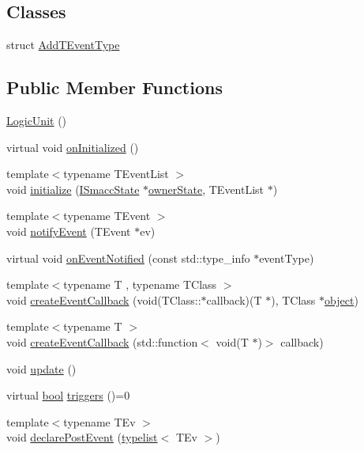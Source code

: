 \subsection*{Classes}
\begin{DoxyCompactItemize}
\item 
struct \hyperlink{structsmacc_1_1LogicUnit_1_1AddTEventType}{Add\+T\+Event\+Type}
\end{DoxyCompactItemize}
\subsection*{Public Member Functions}
\begin{DoxyCompactItemize}
\item 
\hyperlink{classsmacc_1_1LogicUnit_a5c015b00d4c0c3d379cfae8e26a1d474}{Logic\+Unit} ()
\item 
virtual void \hyperlink{classsmacc_1_1LogicUnit_ade7f409516683f13754943db1081bac0}{on\+Initialized} ()
\item 
{\footnotesize template$<$typename T\+Event\+List $>$ }\\void \hyperlink{classsmacc_1_1LogicUnit_ad6abed2fa372c64c7ca7330073ef8c95}{initialize} (\hyperlink{classsmacc_1_1ISmaccState}{I\+Smacc\+State} $\ast$\hyperlink{classsmacc_1_1LogicUnit_a8863d227f46868876632b07b500f27d6}{owner\+State}, T\+Event\+List $\ast$)
\item 
{\footnotesize template$<$typename T\+Event $>$ }\\void \hyperlink{classsmacc_1_1LogicUnit_a1c2bee307f2586bc34c0b75fbc4f6fcf}{notify\+Event} (T\+Event $\ast$ev)
\item 
virtual void \hyperlink{classsmacc_1_1LogicUnit_a3a81929b2014b10d0fa28d4bc2d19d9c}{on\+Event\+Notified} (const std\+::type\+\_\+info $\ast$event\+Type)
\item 
{\footnotesize template$<$typename T , typename T\+Class $>$ }\\void \hyperlink{classsmacc_1_1LogicUnit_a58683bd62b8100434dd4a2e4df5382b9}{create\+Event\+Callback} (void(T\+Class\+::$\ast$callback)(T $\ast$), T\+Class $\ast$\hyperlink{classobject}{object})
\item 
{\footnotesize template$<$typename T $>$ }\\void \hyperlink{classsmacc_1_1LogicUnit_a42103eec6907aaa60f297145ba6ca123}{create\+Event\+Callback} (std\+::function$<$ void(T $\ast$)$>$ callback)
\item 
void \hyperlink{classsmacc_1_1LogicUnit_afcec0608a17e039791403472a2411539}{update} ()
\item 
virtual \hyperlink{classbool}{bool} \hyperlink{classsmacc_1_1LogicUnit_ae975a96f0210412e1cb4a7b5b948ade6}{triggers} ()=0
\item 
{\footnotesize template$<$typename T\+Ev $>$ }\\void \hyperlink{classsmacc_1_1LogicUnit_a76ef62bbd4dccf3da2c03032616b3ef6}{declare\+Post\+Event} (\hyperlink{structsmacc_1_1typelist}{typelist}$<$ T\+Ev $>$)
\end{DoxyCompactItemize}
